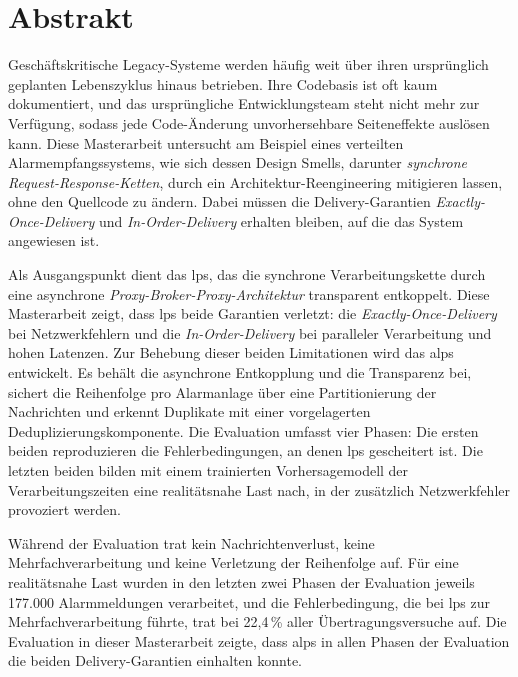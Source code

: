 \chapter*{Abstrakt}

Geschäftskritische Legacy-Systeme werden häufig weit über ihren ursprünglich geplanten Lebenszyklus hinaus betrieben. Ihre Codebasis ist oft kaum dokumentiert, und das ursprüngliche Entwicklungsteam steht nicht mehr zur Verfügung, sodass jede Code-Änderung unvorhersehbare Seiteneffekte auslösen kann. Diese Masterarbeit untersucht am Beispiel eines verteilten Alarmempfangssystems, wie sich dessen Design Smells, darunter \textit{synchrone Request-Re\-sponse-Ketten}, durch ein Architektur-Reengineering mitigieren lassen, ohne den Quellcode zu ändern. Dabei müssen die Delivery-Garantien \textit{Exactly-Once-Delivery} und \textit{In-Order-Delivery} erhalten bleiben, auf die das System angewiesen ist.

Als Ausgangspunkt dient das \gls{lps}, das die synchrone Verarbeitungskette durch eine asynchrone \textit{Proxy-Broker-Proxy-Architektur} transparent entkoppelt. Diese Masterarbeit zeigt, dass \acrshort{lps} beide Garantien verletzt: die \textit{Exactly-Once-Delivery} bei Netzwerkfehlern und die \textit{In-Order-Delivery} bei paralleler Verarbeitung und hohen Latenzen. Zur Behebung dieser beiden Limitationen wird das \gls{alps} entwickelt. Es behält die asynchrone Entkopplung und die Transparenz bei, sichert die Reihenfolge pro Alarmanlage über eine Partitionierung der Nachrichten und erkennt Duplikate mit einer vorgelagerten Deduplizierungskomponente. Die Evaluation umfasst vier Phasen: Die ersten beiden reproduzieren die Fehlerbedingungen, an denen \acrshort{lps} gescheitert ist. Die letzten beiden bilden mit einem trainierten Vorhersagemodell der Verarbeitungszeiten eine realitätsnahe Last nach, in der zusätzlich Netzwerkfehler provoziert werden.

Während der Evaluation trat kein Nachrichtenverlust, keine Mehrfachverarbeitung und keine Verletzung der Reihenfolge auf. Für eine realitätsnahe Last wurden in den letzten zwei Phasen der Evaluation jeweils 177.000 Alarmmeldungen verarbeitet, und die Fehlerbedingung, die bei \acrshort{lps} zur Mehrfachverarbeitung führte, trat bei 22{,}4\,\% aller Übertragungsversuche auf. Die Evaluation in dieser Masterarbeit zeigte, dass \acrshort{alps} in allen Phasen der Evaluation die beiden Delivery-Garantien einhalten konnte.

